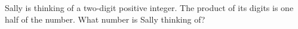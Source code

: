 Sally is thinking of a two-digit positive integer. The product of its digits is one half of the number. What number is Sally thinking of?
